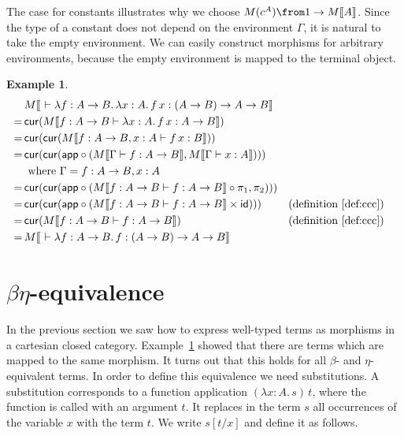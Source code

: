 \documentclass{article}
\newtheorem{exmpl}[defn]{Example}
\newcommand{\type}{\vdash}
\newcommand{\term}{1}
\begin{document}
The case for constants illustrates why we choose $M(c^A) \from \term \to M|[A|]$.
Since the type of a constant does not depend on the environment $\Gamma$, it is natural to take the empty environment.
We can easily construct morphisms for arbitrary environments, because the empty environment is mapped to the terminal object.

\begin{exmpl}
    \label{exp:sem}
    \begin{align*}
            & M |[ \ \type \lambda f: A \to B.\, \lambda x: A.\, f\,x: (A \to B) \to A \to B |] \\
        = \,& \mathsf{cur}(M |[ f: A \to B \type \lambda x: A. \, f\,x : A \to B |]) \\
        = \,& \mathsf{cur}(\mathsf{cur}( M |[ f: A \to B, x: A \type f \, x : B |])) \\
        = \,& \mathsf{cur}(\mathsf{cur}(\mathsf{app} \circ (M |[\Gamma \type f: A \to B |], M |[\Gamma \type x : A|]))) \\
            &  \text{ where } \Gamma = f: A \to B, x: A \\
        = \,& \mathsf{cur}(\mathsf{cur}(\mathsf{app} \circ (M |[ f: A \to B \type f : A \to B |] \circ \pi_1, \pi_2))) \\
        = \,& \mathsf{cur}(\mathsf{cur}(\mathsf{app} \circ (M |[ f: A \to B \type f : A \to B |] \times \mathsf{id}))) && (\text{definition}~\ref{def:ccc}) \\
        = \,& \mathsf{cur}(M |[ f: A \to B \type f : A \to B |]) && (\text{definition}~\ref{def:ccc})\\
        = \,& M |[ \ \type \lambda f: A \to B.\, f: (A \to B) \to A \to B |]
    \end{align*}
\end{exmpl}


\section[beta-eta-equivalence]{$\beta\eta$-equivalence}

In the previous section we saw how to express well-typed terms as morphisms in a cartesian closed category.
Example~\ref{exp:sem} showed that there are terms which are mapped to the same morphism.
It turns out that this holds for all $\beta$- and $\eta$-equivalent terms.
In order to define this equivalence we need substitutions.
A substitution corresponds to a function application $(\lambda x: A.\, s)\, t$, where the function is called with an argument $t$.
It replaces in the term $s$ all occurrences of the variable $x$ with the term $t$.
We write $s[t/x]$ and define it as follows.
\end{document}
